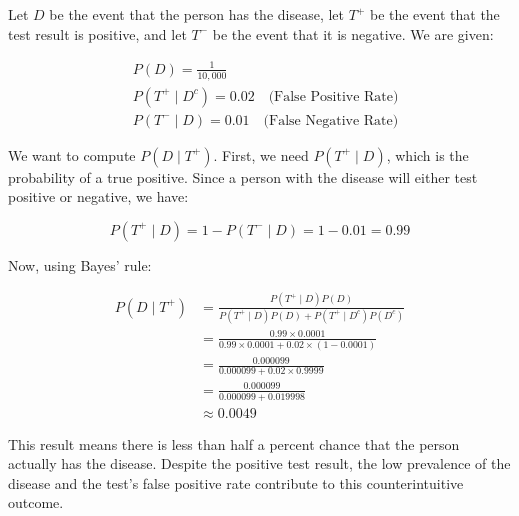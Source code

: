 \begin{solution}
    Let \( D \) be the event that the person has the disease, let \( T^+ \) be the event that the test result is positive, and let \( T^- \) be the event that it is negative. We are given:

\[
\begin{aligned}
& P(D) = \frac{1}{10,000} \\
& P\left(T^+ \mid D^c\right) = 0.02 \quad \text{(False Positive Rate)} \\
& P\left(T^- \mid D\right) = 0.01 \quad \text{(False Negative Rate)}
\end{aligned}
\]

We want to compute \( P(D \mid T^+) \). First, we need \( P(T^+ \mid D) \), which is the probability of a true positive. Since a person with the disease will either test positive or negative, we have:

\[
P(T^+ \mid D) = 1 - P(T^- \mid D) = 1 - 0.01 = 0.99
\]

Now, using Bayes' rule:

\[
\begin{aligned}
P(D \mid T^+) &= \frac{P(T^+ \mid D) P(D)}{P(T^+ \mid D) P(D) + P\left(T^+ \mid D^c\right) P\left(D^c\right)} \\
&= \frac{0.99 \times 0.0001}{0.99 \times 0.0001 + 0.02 \times (1 - 0.0001)} \\
&= \frac{0.000099}{0.000099 + 0.02 \times 0.9999} \\
&= \frac{0.000099}{0.000099 + 0.019998} \\
&\approx 0.0049
\end{aligned}
\]

This result means there is less than half a percent chance that the person actually has the disease. Despite the positive test result, the low prevalence of the disease and the test's false positive rate contribute to this counterintuitive outcome.
\end{solution}

